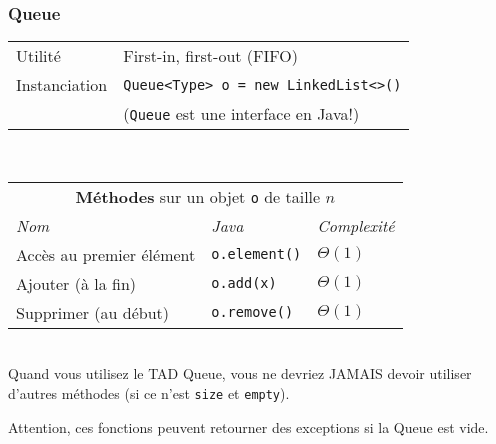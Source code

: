 \documentclass[8pt,aspectratio=169]{beamer}
\begin{document}
\begin{frame}
\frametitle{Queue}
\centering
\begin{tabular}{ll}
	Utilité & First-in, first-out (FIFO)\\
	Instanciation & \texttt{Queue<Type> o = new LinkedList<>()}\\
	& \color{red} (\texttt{Queue} est une interface en Java!)\\
\end{tabular}\\
\vspace{0.5cm}
\centering
\begin{tabular}{lll}
	\multicolumn{3}{c}{\textbf{Méthodes} sur un objet \texttt{o} de taille $n$} \\
	\textit{Nom} & \textit{Java} & \textit{Complexité} \\
	Accès au premier élément & \texttt{o.element()} & $\Theta(1)$\\
	Ajouter (à la fin) & \texttt{o.add(x)} & $\Theta(1)$\\
	Supprimer (au début) & \texttt{o.remove()} & $\Theta(1)$\\
\end{tabular}\\
\vspace{0.5cm}
\color{blue} Quand vous utilisez le TAD Queue, vous ne devriez JAMAIS devoir utiliser d'autres méthodes (si ce n'est \texttt{size} et \texttt{empty}). 

\color{blue} Attention, ces fonctions peuvent retourner des exceptions si la Queue est vide.
\end{frame}
\end{document}
